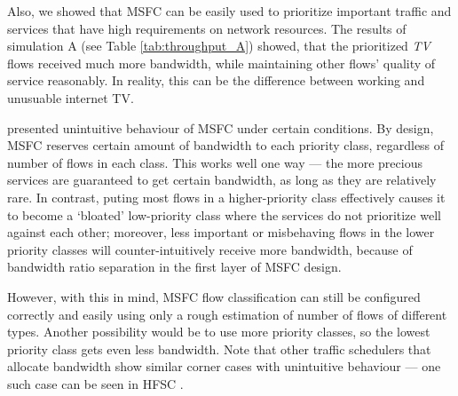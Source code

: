 Also, we showed that MSFC can be easily used to prioritize important traffic and services that have high requirements on network resources. The results of simulation A (see Table \ref{tab:throughput_A}) showed, that the prioritized \emph{TV} flows received much more bandwidth, while maintaining other flows' quality of service reasonably. In reality, this can be the difference between working and unusuable internet TV. 

 presented unintuitive behaviour of MSFC under certain conditions. By design, MSFC reserves certain amount  of bandwidth to each priority class, regardless of number of flows in each class. This works well one way --- the more precious services are guaranteed to get certain bandwidth, as long as they are relatively rare. In contrast, puting most flows in a higher-priority class effectively causes it to become a `bloated' low-priority class where the services do not prioritize well against each other; moreover, less important or misbehaving flows in the lower priority classes will counter-intuitively receive more bandwidth, because of bandwidth ratio separation in the first layer of MSFC design.

However, with this in mind, MSFC flow classification can still be configured correctly and easily using only a rough estimation of number of flows of different types. Another possibility would be to use more priority classes, so the lowest priority class gets even less bandwidth. Note that other traffic schedulers that allocate bandwidth show similar corner cases with unintuitive behaviour --- one such case can be seen in HFSC \cite[Corner cases section]{hfscMan}.











